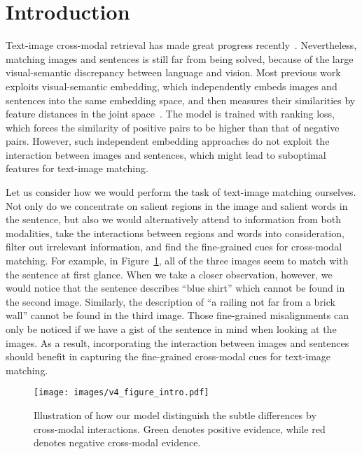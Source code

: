 \documentclass[10pt,twocolumn,letterpaper]{article}
\begin{document}
\section{Introduction}

Text-image cross-modal retrieval has made great progress recently~\cite{lee2018stacked,gu2018look,nam2016dual,faghri2017vse++,eisenschtat2017linking}. 
Nevertheless, matching images and sentences is still far from being solved, because of the large visual-semantic discrepancy between language and vision. 
Most previous work exploits visual-semantic embedding, which independently embeds images and sentences into the same embedding space, and then measures their similarities by feature distances in the joint space~\cite{karpathy2015deep,faghri2017vse++}. 
The model is trained with ranking loss, which forces the similarity of positive pairs to be higher than that of negative pairs. 
However, such independent embedding approaches do not exploit the interaction between images and sentences, which might lead to suboptimal features for text-image matching. 


Let us consider how we would perform the task of text-image matching ourselves. 
Not only do we concentrate on salient regions in the image and salient words in the sentence, but also we would alternatively attend to information from both modalities, take the interactions between regions and words into consideration, filter out irrelevant information, and find the fine-grained cues for cross-modal matching.
For example, in Figure~\ref{fig:intro_compare}, all of the three images seem to match with the sentence at first glance. 
When we take a closer observation, however, we would notice that the sentence describes ``blue shirt'' which cannot be found in the second image. 
Similarly, the description of ``a railing not far from a brick wall'' cannot be found in the third image. 
Those fine-grained misalignments can only be noticed if we have a gist of the sentence in mind when looking at the images.
As a result, incorporating the interaction between images and sentences should benefit in capturing the fine-grained cross-modal cues for text-image matching. 

\begin{figure}[t]
\begin{center}
   \texttt{[image: images/v4\_figure\_intro.pdf]}
\end{center}
\vspace{-10pt}
   \caption{Illustration of how our model distinguish the subtle differences by cross-modal interactions. Green denotes positive evidence, while red denotes negative cross-modal evidence.}
\label{fig:intro_compare}
\vspace{-17pt}
\end{figure}
\end{document}
